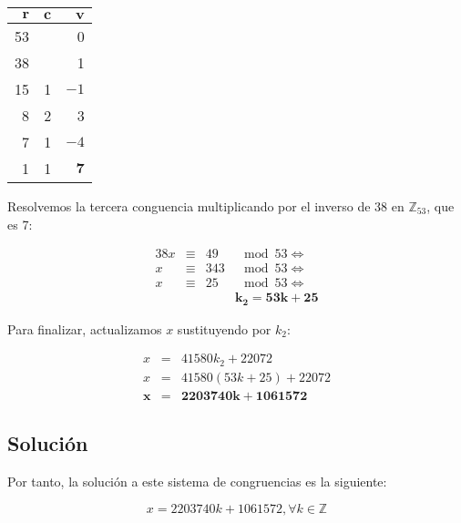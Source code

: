 \begin{center}
\begin{tabular}{r r r}
	$\boldsymbol{r}$ & $\boldsymbol{c}$ & $\boldsymbol{v}$ \\
	\toprule
	53               &                  & 0                \\
	38               &                  & 1                \\
	15               & 1                & $-1$             \\
	8                & 2                & 3                \\
	7                & 1                & $-4$             \\
	1                & 1                & $\boldsymbol{7}$ \\
\end{tabular}
\end{center}

Resolvemos la tercera conguencia multiplicando por el inverso de 38 en $\mathbb{Z}_{53}$, que es 7:

\[
\begin{array}{rcrl}
	38x & \equiv & 49  & \mod 53 \iff \\
	x   & \equiv & 343 & \mod 53 \iff \\
	x   & \equiv & 25  & \mod 53 \iff \\
       &        &     & \boldsymbol{k_2 = 53k + 25}
\end{array}
\]

Para finalizar, actualizamos $x$ sustituyendo por $k_2$:

\[
\begin{array}{rcl}
	x              & =              & 41580k_2 + 22072        \\
	x              & =              & 41580(53k + 25) + 22072 \\
	\boldsymbol{x} & \boldsymbol{=} & \boldsymbol{2203740k + 1061572}
\end{array}
\]

\subsection*{Solución}

Por tanto, la solución a este sistema de congruencias es la siguiente:

\[x = 2203740k + 1061572, \forall k \in\mathbb{Z}\]
